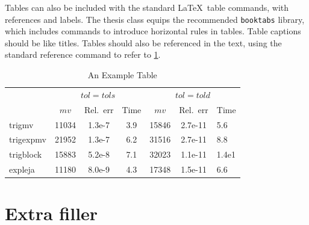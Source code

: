 Tables can also be included with the standard \LaTeX \ table commands, with
references and labels. The thesis class equips the recommended
\texttt{booktabs} library, which includes commands to introduce horizontal
rules in tables. Table captions should be like titles. Tables should also
be referenced in the text, using the standard reference command to refer
to \ref{tab:example}.

\begin{table}
  \begin{center}
\caption{\label{tab:example} An Example Table}
\begin{tabular}{lcccccl}
  \toprule
& \multicolumn{3}{c}{$tol=tols$} & \multicolumn{3}{c}{$tol=told$}
\\\cmidrule(lr){2-4}
\cmidrule(lr){5-7}
           & $mv$  & Rel.~err & Time    & $mv$  & Rel.~err & Time\\
\midrule
trigmv    & 11034 & 1.3e-7 & 3.9 & 15846 & 2.7e-11 & 5.6 \\
trigexpmv & 21952 & 1.3e-7 & 6.2 & 31516 & 2.7e-11 & 8.8 \\
trigblock & 15883 & 5.2e-8 & 7.1 & 32023 & 1.1e-11 & 1.4e1\\
expleja   & 11180 & 8.0e-9 & 4.3 & 17348 & 1.5e-11 & 6.6 \\
\bottomrule
\end{tabular}
\end{center}
\end{table}

\section{Extra filler}
\lipsum
